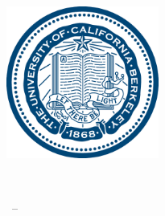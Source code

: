 
\begin{titlepage}

\begin{addmargin}[-1cm]{-3cm}
\begin{center}
\large

\hfill
\vfill

\begingroup
\color{title}\Large\spacedallcaps{\myTitle} \\ \bigskip %
\endgroup

\spacedallcaps{\myName} %

\vfill

\includegraphics[width=5cm]{figures/ucberkeleyseal_line_540.eps} \\ \medskip %

\mySubtitle \\ \medskip %

\myTime\ -- \myVersion %

\vfill

\end{center}
\end{addmargin}

\end{titlepage}
